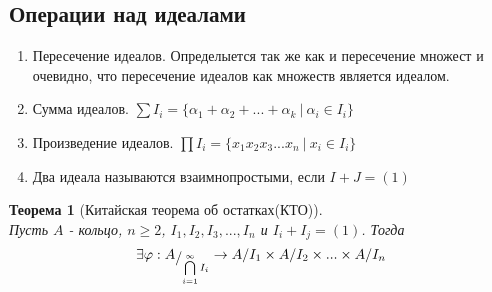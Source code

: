 \documentclass[12pt, a4paper]{article}
\newcommand{\bo}{\geqslant}
\theoremstyle{plain}
\newtheorem*{Th*}{Теорема}
\theoremstyle{definition}
\begin{document}
\subsection*{Операции над идеалами}
\begin{enumerate}
    \item Пересечение идеалов. Определыется так же как и пересечение множест и очевидно, что пересечение идеалов как множеств является идеалом.
    \item Сумма идеалов. $\sum I_i = \{\alpha_1+\alpha_2+...+\alpha_k \ | \ \alpha_i\in I_i\}$
    \item Произведение идеалов. $\prod I_i = \{x_1x_2x_3...x_n\ | \ x_i\in I_i\}$
    \item Два идеала называются взаимнопростыми, если $I+J = (1)$
\end{enumerate}
\begin{Th*}[Китайская теорема об остатках(КТО)] ~\\
    
    Пусть $A$ - кольцо, $n\bo 2$, $I_1,I_2,I_3,...,I_n$  и  $I_i+I_j = (1)$. Тогда 
    \[\exists\varphi:A\raisebox{-.5ex}{$/$}_{\bigcap\limits_{i=1}^{\infty}I_i} \to A/I_1\times A/I_2\times...\times A/I_n\]
\end{Th*}
\end{document}
